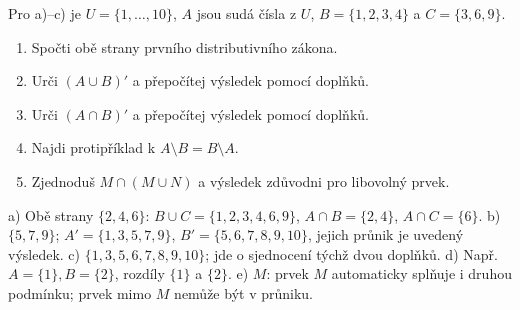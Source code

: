 \documentclass[11pt,a4paper]{article}
\begin{document}
\begin{zadaniReseniBox}[title={D1: 12–18 minut}]
Pro a)–c) je $U=\{1,\ldots,10\}$, $A$ jsou sudá čísla z $U$,
$B=\{1,2,3,4\}$ a $C=\{3,6,9\}$.
\begin{enumerate}[label=\alph*)]
\item Spočti obě strany prvního distributivního zákona.
\item Urči $(A\cup B)'$ a přepočítej výsledek pomocí doplňků.
\item Urči $(A\cap B)'$ a přepočítej výsledek pomocí doplňků.
\item Najdi protipříklad k $A\setminus B=B\setminus A$.
\item Zjednoduš $M\cap(M\cup N)$ a výsledek zdůvodni pro libovolný prvek.
\end{enumerate}
\tcblower
a) Obě strany $\{2,4,6\}$: $B\cup C=\{1,2,3,4,6,9\}$,
$A\cap B=\{2,4\}$, $A\cap C=\{6\}$.
b) $\{5,7,9\}$; $A'=\{1,3,5,7,9\}$, $B'=\{5,6,7,8,9,10\}$,
jejich průnik je uvedený výsledek.
c) $\{1,3,5,6,7,8,9,10\}$; jde o sjednocení týchž dvou doplňků.
d) Např. $A=\{1\}, B=\{2\}$, rozdíly $\{1\}$ a $\{2\}$.
e) $M$: prvek $M$ automaticky splňuje i druhou podmínku;
prvek mimo $M$ nemůže být v průniku.
\end{zadaniReseniBox}
\end{document}
